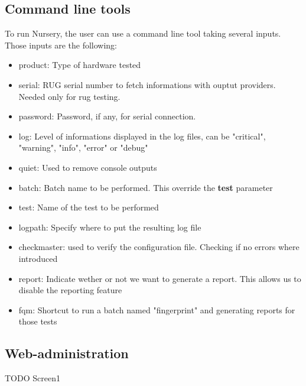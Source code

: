 \documentclass[12pt]{article}
\begin{document}
\subsection{Command line tools}

To run Nursery, the user can use a command line tool taking several inputs. Those inputs are the following:

\begin{itemize}
\item product: Type of hardware tested
\item serial: RUG serial number to fetch informations with ouptut providers. Needed only for \gls{rug} testing.
\item password: Password, if any, for serial connection.
\item log: Level of informations displayed in the log files, can be "critical", "warning", "info", "error" or "debug"
\item quiet: Used to remove console outputs
\item batch: Batch name to be performed. This override the \textbf{test} parameter
\item test: Name of the test to be performed
\item logpath: Specify where to put the resulting log file
\item checkmaster: used to verify the configuration file. Checking if no errors where introduced
\item report: Indicate wether or not we want to generate a report. This allows us to disable the reporting feature
\item fqm: Shortcut to run a batch named "fingerprint" and generating reports for those tests
\end{itemize}

\subsection{Web-administration}

TODO Screen1

\end{document}
